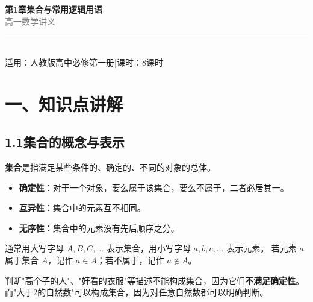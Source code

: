 \documentclass[12pt, a4paper]{ctexart}
\begin{document}
\begin{center}
{\Huge\bfseries\textcolor{mainblue}{第1章\quad 集合与常用逻辑用语}}\\[12pt]
{\Large\textcolor{gray}{高一数学讲义}}\\[8pt]
\rule{0.6\textwidth}{1pt}\\[8pt]
{\normalsize 适用：人教版高中必修第一册\quad |\quad 课时：8课时}
\end{center}
\vspace{10pt}

\section*{\textcolor{mainblue}{一、知识点讲解}}

\subsection*{1.1\quad 集合的概念与表示}

\begin{knowledgebox}[集合的定义]
\textbf{集合}是指满足某些条件的、确定的、不同的对象的总体。
\begin{itemize}[leftmargin=2em]
  \item \textbf{确定性}：对于一个对象，要么属于该集合，要么不属于，二者必居其一。
  \item \textbf{互异性}：集合中的元素互不相同。
  \item \textbf{无序性}：集合中的元素没有先后顺序之分。
\end{itemize}
通常用大写字母 $A, B, C, \ldots$ 表示集合，用小写字母 $a, b, c, \ldots$ 表示元素。
若元素 $a$ 属于集合 $A$，记作 $a \in A$；若不属于，记作 $a \notin A$。
\end{knowledgebox}

\begin{warnbox}
判断"高个子的人"、"好看的衣服"等描述不能构成集合，因为它们\textbf{不满足确定性}。而"大于2的自然数"可以构成集合，因为对任意自然数都可以明确判断。
\end{warnbox}
\end{document}
